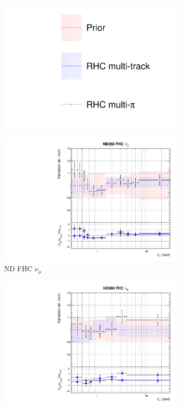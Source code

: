 \begin{figure}[t]
\centering
\begin{subfigure}{0.95\textwidth}
  \centering
  \includegraphics[width=0.24\linewidth]{figs/rhcmpdat28_leg}	
\end{subfigure}
\begin{subfigure}{0.24\textwidth}
  \centering
  \includegraphics[width=0.95\linewidth]{figs/rhcmpdat28flux_0}
  \caption{ND FHC $\nu_{\mu}$}
\end{subfigure}
\begin{subfigure}{0.24\textwidth}
  \centering
  \includegraphics[width=0.95\linewidth]{figs/rhcmpdat28flux_1}

\end{subfigure}
\end{figure}

